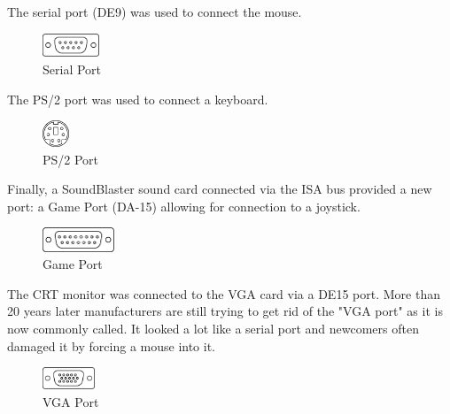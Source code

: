 \documentclass[book.tex]{subfiles}
\begin{document}
The serial port (DE9) was used to connect the mouse.
 \begin{figure}[H]
\centering
\includegraphics[width=0.15\textwidth]{imgs/drawings/ports/DE9_serial_port.eps}
\caption{Serial Port}
\label{fig:serialPort}
\end{figure}

The PS/2 port was used to connect a keyboard.
 \begin{figure}[H]
\centering
\includegraphics[width=0.07\textwidth]{imgs/drawings/ports/MiniDIN-6_PS2.eps}
\caption{PS/2 Port}
\label{fig:ps2Port}
\end{figure}


Finally, a SoundBlaster sound card connected via the ISA bus provided a new port: a Game Port (DA-15) allowing for connection to a joystick.
 \begin{figure}[H]
\centering
\includegraphics[width=0.19\textwidth]{imgs/drawings/ports/DA-15_GamePort.eps}
\caption{Game Port}
\label{fig:gamePort}
\end{figure}

 The CRT monitor was connected to the VGA card via a DE15 port. More than 20 years later manufacturers are still trying to get rid of the "VGA port" as it is now commonly called. It looked a lot like a serial port and newcomers often damaged it by forcing a mouse into it.
 \begin{figure}[H]
\centering
\includegraphics[width=0.14\textwidth]{imgs/drawings/DE15_VGA.eps}
\caption{VGA Port}
\label{fig:ps2Port}
\end{figure}
\end{document}
